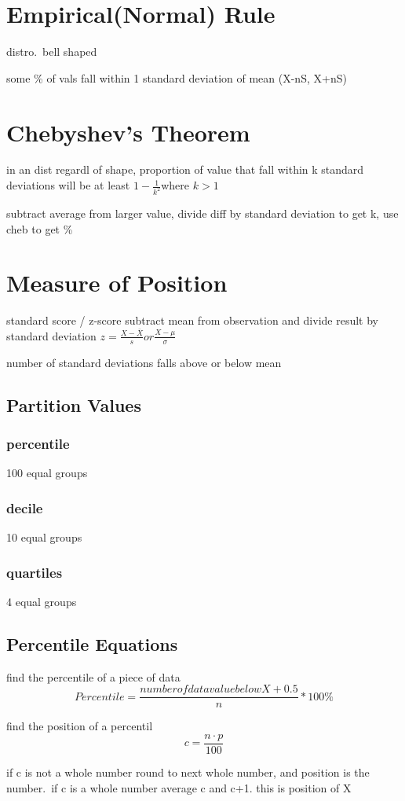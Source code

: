 \documentclass[11pt]{article}
\begin{document}
\section{Empirical(Normal) Rule}
\par distro.\ bell shaped
\par some \% of vals fall within 1 standard deviation of mean (X-nS, X+nS)
\section{Chebyshev's Theorem}
\par in an dist regardl of shape, proportion of value that fall within k standard deviations will be at least $1-\frac{1}{k^2}$where $k > 1$
\par subtract average from larger value, divide diff by standard deviation to get k, use cheb to get \%
\section{Measure of Position}
\par standard score / z-score subtract mean from observation and divide result by standard deviation $z = \frac {X - \bar{X}}{s}  or  \frac{X - \mu}{\sigma} $
\par number of standard deviations falls above or below mean
\subsection{Partition Values}
\subsubsection{percentile}
\par 100 equal groups
\subsubsection{decile}
\par 10 equal groups
\subsubsection{quartiles}
\par 4 equal groups
\subsection{Percentile Equations}
\par find the percentile of a piece of data
\begin{equation}
  Percentile = \frac{number of data value below X + 0.5}{n} * 100\%
\end{equation}
\par find the position of a percentil
\begin{equation}
  c = \frac{n \cdot p}{100}
\end{equation}
\par if c is not a whole number round to next whole number, and position is
the number.\ if c is a whole number average c and c+1. this is position of
X
\end{document}
